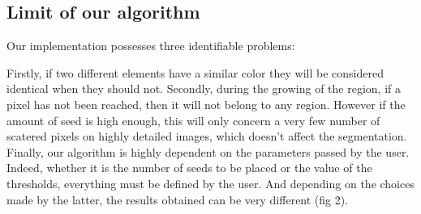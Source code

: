 \documentclass[conference]{IEEEtran}
\begin{document}
\subsection{Limit of our algorithm}

Our implementation possesses three identifiable problems:

Firstly, if two different elements have a similar color they will be considered identical when they should not.
Secondly, during the growing of the region, if a pixel has not been reached, then it will not belong to any region. However if the amount of seed is high enough, this will only concern a very few number of scatered pixels on highly detailed images, which doesn't affect the segmentation.
Finally, our algorithm is highly dependent on the parameters passed by the user. Indeed, whether it is the number of seeds to be placed or the value of the thresholds, everything must be defined by the user. And depending on the choices made by the latter, the results obtained can be very different (fig 2).
\end{document}
